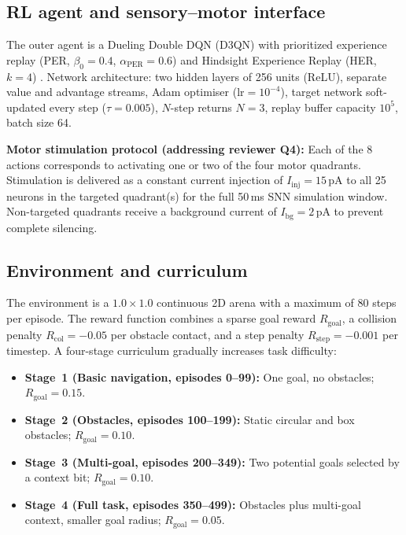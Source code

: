 \documentclass[journal,twocolumn]{IEEEtran}
\begin{document}
\subsection{RL agent and sensory--motor interface}

The outer agent is a Dueling Double DQN (D3QN) with prioritized
experience replay (PER, $\beta_{0}=0.4$, $\alpha_{\mathrm{PER}}=0.6$)
and Hindsight Experience Replay (HER, $k=4$)
\cite{Wang2016dueling,VanHasselt2016,Andrychowicz2017HER}.  Network
architecture: two hidden layers of 256 units (ReLU), separate value
and advantage streams, Adam optimiser ($\text{lr}=10^{-4}$), target
network soft-updated every step ($\tau = 0.005$), $N$-step returns
$N=3$, replay buffer capacity $10^{5}$, batch size 64.

\textbf{Motor stimulation protocol (addressing reviewer Q4):} Each of
the 8 actions corresponds to activating one or two of the four motor
quadrants.  Stimulation is delivered as a constant current injection
of $I_{\mathrm{inj}} = 15$\,pA to all 25 neurons in the targeted
quadrant(s) for the full 50\,ms SNN simulation window.  Non-targeted
quadrants receive a background current of $I_{\mathrm{bg}} = 2$\,pA
to prevent complete silencing.

\subsection{Environment and curriculum}

The environment is a $1.0 \times 1.0$ continuous 2D arena with a
maximum of 80 steps per episode.  The reward function combines a
sparse goal reward $R_{\mathrm{goal}}$, a collision penalty
$R_{\mathrm{col}} = -0.05$ per obstacle contact, and a step penalty
$R_{\mathrm{step}} = -0.001$ per timestep.  A four-stage curriculum
gradually increases task difficulty:
\begin{itemize}
\item \textbf{Stage~1 (Basic navigation, episodes 0--99):} One goal,
      no obstacles; $R_{\mathrm{goal}} = 0.15$.
\item \textbf{Stage~2 (Obstacles, episodes 100--199):} Static circular
      and box obstacles; $R_{\mathrm{goal}} = 0.10$.
\item \textbf{Stage~3 (Multi-goal, episodes 200--349):} Two potential
      goals selected by a context bit; $R_{\mathrm{goal}} = 0.10$.
\item \textbf{Stage~4 (Full task, episodes 350--499):} Obstacles plus
      multi-goal context, smaller goal radius; $R_{\mathrm{goal}} = 0.05$.
\end{itemize}
\end{document}
